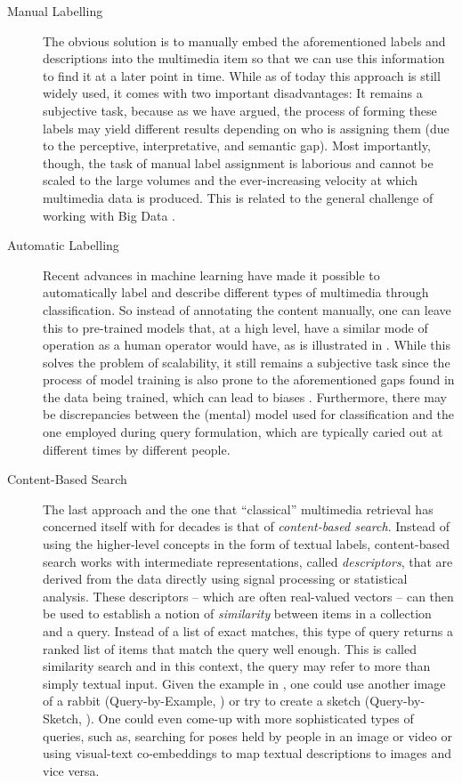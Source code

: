 \begin{description}
    \item[Manual Labelling] The obvious solution is to manually embed the aforementioned labels and descriptions into the multimedia item so that we can use this information to find it at a later point in time. While as of today this approach is still widely used, it comes with two important disadvantages: It remains a subjective task, because as we have argued, the process of forming these labels may yield different results depending on who is assigning them (due to the perceptive, interpretative, and semantic gap). Most importantly, though, the task of manual label assignment is laborious and cannot be scaled to the large volumes and the ever-increasing velocity at which multimedia data is produced. This is related to the general challenge of working with Big Data \cite{Khan:2014Seven}.
    \item[Automatic Labelling] Recent advances in machine learning have made it possible to automatically label \cite{Redmon:2016You} and describe \cite{Radford:2021Learning} different types of multimedia through classification. So instead of annotating the content manually, one can leave this to pre-trained models that, at a high level, have a similar mode of operation as a human operator would have, as is illustrated in . While this solves the problem of scalability, it still remains a subjective task since the process of model training is also prone to the aforementioned gaps found in the data being trained, which can lead to biases \cite{Baer2017:Controlling}. Furthermore, there may be discrepancies between the (mental) model used for classification and the one employed during query formulation, which are typically caried out at different times by different people.
    \item[Content-Based Search] The last approach and the one that ``classical'' multimedia retrieval has concerned itself with for decades is that of \emph{content-based search}. Instead of using the higher-level concepts in the form of textual labels, content-based search works with intermediate representations, called \emph{descriptors}, that are derived from the data directly using signal processing or statistical analysis. These descriptors -- which are often real-valued vectors \cite{Zezula:2006Similarity} -- can then be used to establish a notion of \emph{similarity} between items in a collection and a query. Instead of a list of exact matches, this type of query returns a ranked list of items that match the query well enough. This is called similarity search \cite{Blanken:2007multimedia} and in this context, the query may refer to more than simply textual input. Given the example in , one could use another image of a rabbit (Query-by-Example, \cite{Kelly:1995Query}) or try to create a sketch (Query-by-Sketch, \cite{Sciascio:1999Content}). One could even come-up with more sophisticated types of queries, such as, searching for poses held by people in an image or video \cite{Heller:2022Multi} or using visual-text co-embeddings \cite{Radford:2021Learning,Spiess:2022Multi} to map textual descriptions to images and vice versa.
\end{description}

